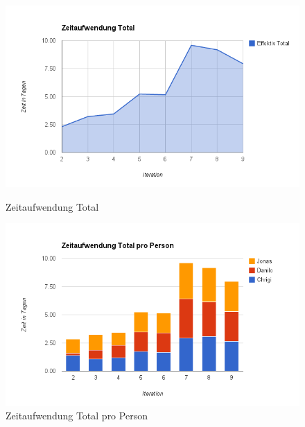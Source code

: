 \begin{figure}
	\begin{minipage}[t]{0.45\textwidth}
		\includegraphics[width=\linewidth]{images/zeitplanung/chart_1}
		\caption{Zeitaufwendung Total}
		\label{zeitanalyse:total}
	\end{minipage}
	\hspace{\fill}
	\begin{minipage}[t]{0.45\textwidth}
		\includegraphics[width=\linewidth]{images/zeitplanung/chart_2}
		\caption{Zeitaufwendung Total pro Person}
		\label{zeitanalyse:total-pro-person}
	\end{minipage}

	\vspace{2cm}


\end{figure}
